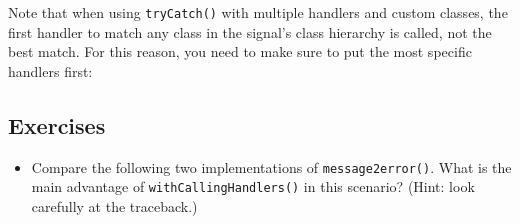 Note that when using \texttt{tryCatch()} with multiple handlers and
custom classes, the first handler to match any class in the signal's
class hierarchy is called, not the best match. For this reason, you need
to make sure to put the most specific handlers first:

\begin{Shaded}
\begin{Highlighting}[]
\NormalTok{(}\NormalTok{(}\NormalTok{, }\NormalTok{),}
   \NormalTok{,}
   
\NormalTok{)}
\NormalTok{(}\NormalTok{(}\NormalTok{, }\NormalTok{),}
   \NormalTok{,}
   
\NormalTok{)}
\end{Highlighting}
\end{Shaded}

\subsection{Exercises}

\begin{itemize}
\item
  Compare the following two implementations of \texttt{message2error()}.
  What is the main advantage of \texttt{withCallingHandlers()} in this
  scenario? (Hint: look carefully at the traceback.)

\begin{Shaded}
\begin{Highlighting}[]
\StringTok{ }
   
\NormalTok{\}}
\StringTok{ }
   
\NormalTok{\}}
\end{Highlighting}
\end{Shaded}
\end{itemize}



